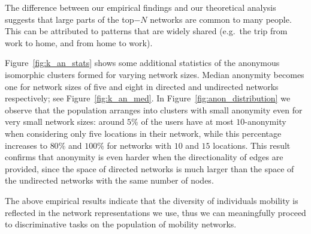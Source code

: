 The difference between our empirical findings and our theoretical analysis suggests that large parts of the top$-N$ networks are common to many people.
This can be attributed to patterns that are widely shared (e.g.\ the trip from work to home, and from home to work).

 Figure~\ref{fig:k_an_stats} shows some additional statistics of the anonymous isomorphic clusters formed for varying network sizes.
 Median anonymity becomes one for network sizes of five and eight in directed and undirected networks respectively; see Figure~\ref{fig:k_an_med}.
 In Figure~\ref{fig:anon_distribution} we observe that the population arranges into clusters with small anonymity even for very small network sizes: around $5\%$  of the users have at most $10$-anonymity when considering only five locations in their network, while this percentage increases to $80\%$ and $100\% $ for networks with $10$ and $15$ locations.
 This result confirms that anonymity is even harder when the directionality of edges are provided, since the space of directed networks is much larger than the space of the undirected networks with the same number of nodes.

 The above empirical results indicate that the diversity of individuals mobility is reflected in the network representations we use, thus we can meaningfully proceed to discriminative tasks on the population of mobility networks.

